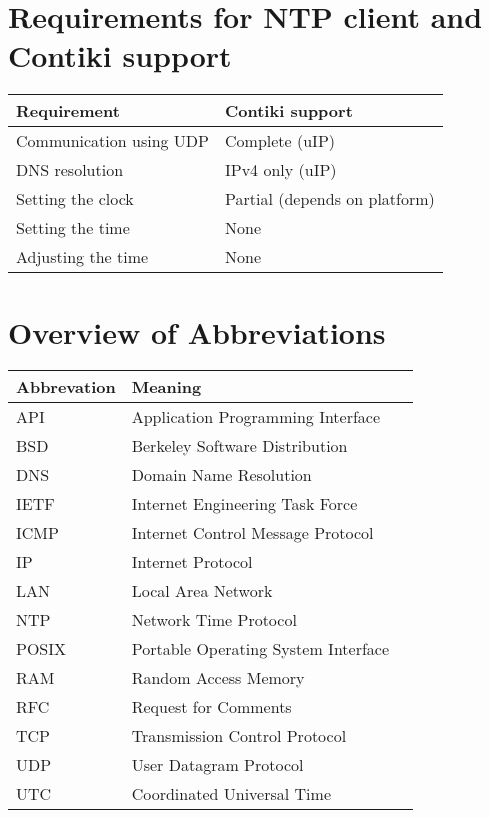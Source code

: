 

\chapter{Requirements for NTP client and Contiki support}\label{app:requirements}
\begin{tabular}{|l|l|}
	\hline
	Requirement & Contiki support \\ \hline
	Communication using UDP & Complete (uIP) \\
	DNS resolution & IPv4 only (uIP) \\
	Setting the clock & Partial (depends on platform) \\
	Setting the time & None \\
	Adjusting the time & None \\
	\hline
\end{tabular}

\chapter{Overview of Abbreviations}
\begin{tabular}{|l|l|l|}
	\hline
	Abbrevation & Meaning \\ \hline
	API & Application Programming Interface \\
	BSD & Berkeley Software Distribution \\
	DNS & Domain Name Resolution \\
	IETF & Internet Engineering Task Force \\
	ICMP & Internet Control Message Protocol \\
	IP & Internet Protocol \\
	LAN & Local Area Network \\
	NTP & Network Time Protocol \\
	POSIX & Portable Operating System Interface \\
	RAM & Random Access Memory \\
	RFC & Request for Comments \\
	TCP & Transmission Control Protocol \\
	UDP & User Datagram Protocol \\
	UTC & Coordinated Universal Time \\
	\hline
\end{tabular}
